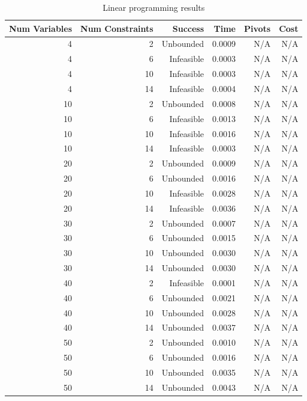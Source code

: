 \begin{table}[ht]
    \centering
    \begin{tabular}{rrrrrr}
        \toprule
        Num Variables & Num Constraints & Success & Time & Pivots & Cost \\
        \midrule
        4 & 2 & Unbounded & 0.0009 & N/A & N/A \\
		4 & 6 & Infeasible & 0.0003 & N/A & N/A \\
		4 & 10 & Infeasible & 0.0003 & N/A & N/A \\
		4 & 14 & Infeasible & 0.0004 & N/A & N/A \\
		10 & 2 & Unbounded & 0.0008 & N/A & N/A \\
		10 & 6 & Infeasible & 0.0013 & N/A & N/A \\
		10 & 10 & Infeasible & 0.0016 & N/A & N/A \\
		10 & 14 & Infeasible & 0.0003 & N/A & N/A \\
		20 & 2 & Unbounded & 0.0009 & N/A & N/A \\
		20 & 6 & Unbounded & 0.0016 & N/A & N/A \\
		20 & 10 & Infeasible & 0.0028 & N/A & N/A \\
		20 & 14 & Infeasible & 0.0036 & N/A & N/A \\
		30 & 2 & Unbounded & 0.0007 & N/A & N/A \\
		30 & 6 & Unbounded & 0.0015 & N/A & N/A \\
		30 & 10 & Unbounded & 0.0030 & N/A & N/A \\
		30 & 14 & Unbounded & 0.0030 & N/A & N/A \\
		40 & 2 & Infeasible & 0.0001 & N/A & N/A \\
		40 & 6 & Unbounded & 0.0021 & N/A & N/A \\
		40 & 10 & Unbounded & 0.0028 & N/A & N/A \\
		40 & 14 & Unbounded & 0.0037 & N/A & N/A \\
		50 & 2 & Unbounded & 0.0010 & N/A & N/A \\
		50 & 6 & Unbounded & 0.0016 & N/A & N/A \\
		50 & 10 & Unbounded & 0.0035 & N/A & N/A \\
		50 & 14 & Unbounded & 0.0043 & N/A & N/A \\
        \bottomrule
    \end{tabular}
    \caption{Linear programming results}
    \label{tab:lp-results}
\end{table}